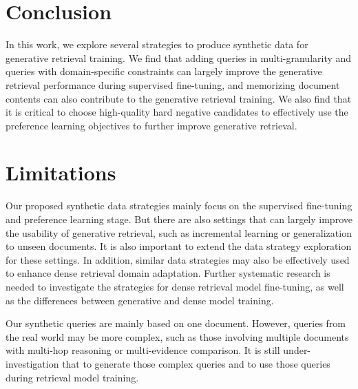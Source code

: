 \section{Conclusion}
In this work, we explore several strategies to produce synthetic data for generative retrieval training. We find that adding queries in multi-granularity and queries with domain-specific constraints can largely improve the generative retrieval performance during supervised fine-tuning, and memorizing document contents can also contribute to the generative retrieval training. We also find that it is critical to choose high-quality hard negative candidates to effectively use the preference learning objectives to further improve generative retrieval.

\section*{Limitations}
Our proposed synthetic data strategies mainly focus on the supervised fine-tuning and preference learning stage. But there are also settings that can largely improve the usability of generative retrieval, such as incremental learning or generalization to unseen documents. It is also important to extend the data strategy exploration for these settings. In addition, similar data strategies may also be effectively used to enhance dense retrieval domain adaptation. Further systematic research is needed to investigate the strategies for dense retrieval model fine-tuning, as well as the differences between generative and dense model training.

Our synthetic queries are mainly based on one document. However, queries from the real world may be more complex, such as those involving multiple documents with multi-hop reasoning or multi-evidence comparison. It is still under-investigation that to generate those complex queries and to use those queries during retrieval model training.
